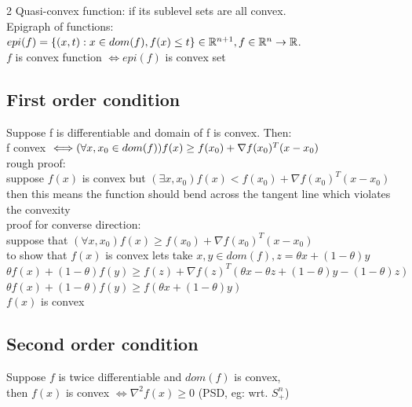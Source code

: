 \documentclass[8pt]{extarticle}
\newcommand{\R}{\mathbb{R}}
\begin{document}
\begin{multicols*}{2}
  Quasi-convex function: if its sublevel sets are all convex.\\
  
  Epigraph of functions:\\
  $epi(f)=\{(x,t): x \in dom(f), f(x) \leq t\} \in \R^{n+1}, \\f \in \R^n \to \R$.\\
  
 $f$ is convex function $\iff epi(f)$ is convex set\\

 \vfill\null
 \columnbreak
 
 \subsection{First order condition}
 Suppose f is differentiable and domain of f is convex. Then:\\
 f convex $\iff \\ (\forall x,x_0 \in dom(f)) f(x) \geq f(x_0) + \nabla f(x_0)^T(x-x_0)$\\

  rough proof:\\
  suppose $f(x)$ is convex but $(\exists x, x_0) f(x) < f(x_0) + \nabla f(x_0)^T(x-x_0)$\\
  then this means the function should bend across the tangent line which violates the convexity\\
  
  proof for converse direction:\\
  suppose that $(\forall x, x_0) f(x) \geq f(x_0) + \nabla f(x_0)^T(x-x_0)$\\
  to show that $f(x)$ is convex lets take $x,y \in dom(f), z= \theta x + (1-\theta)y$\\
  $\theta f(x) + (1-\theta) f(y) \geq f(z) + \nabla f(z)^T(\theta x - \theta z + (1-\theta)y - (1-\theta)z)$\\
  $\theta f(x) + (1-\theta) f(y) \geq f(\theta x +(1-\theta)y)$\\
  $f(x)$ is convex
  \subsection{Second order condition}
  Suppose $f$ is twice differentiable and $dom(f)$ is convex, \\
  then $f(x)$ is convex $\iff \nabla^2 f(x) \geq 0 $ (PSD, eg: wrt. $S_+^n$)\\
  

\end{multicols*}
\end{document}
